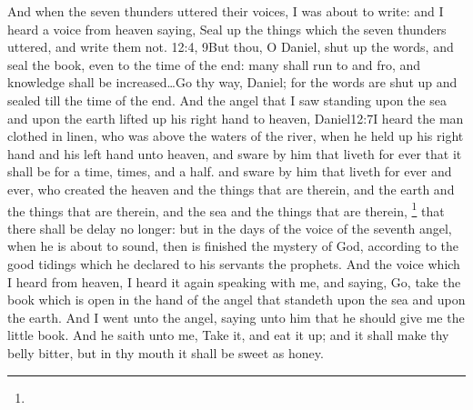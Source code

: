 And when the seven thunders uttered their voices, I was about to write: and I heard a voice from heaven saying, Seal up the things which the seven thunders uttered, and write them not.%
					{12:4, 9}{But thou, O Daniel, shut up the words, and seal the book, even to the time of the end: many shall run to and fro, and knowledge shall be increased\ldots Go thy way, Daniel; for the words are shut up and sealed till the time of the end.} %
And the angel that I saw standing upon the sea and upon the earth lifted up his right hand to heaven,%
					{Daniel}{12:7}{I heard the man clothed in linen, who was above the waters of the river, when he held up his right hand and his left hand unto heaven, and sware by him that liveth for ever that it shall be for a time, times, and a half.} %
and sware by him that liveth for ever and ever, who created the heaven and the things that are therein, and the earth and the things that are therein, and the sea and the things that are therein,%
	\footnote{%
	} %
that there shall be delay no longer: 
but in the days of the voice of the seventh angel, when he is about to sound, then is finished the mystery of God, according to the good tidings which he declared to his servants the prophets. 
And the voice which I heard from heaven, I heard it again speaking with me, and saying, Go, take the book which is open in the hand of the angel that standeth upon the sea and upon the earth. 
And I went unto the angel, saying unto him that he should give me the little book. And he saith unto me, Take it, and eat it up; and it shall make thy belly bitter, but in thy mouth it shall be sweet as honey. 
